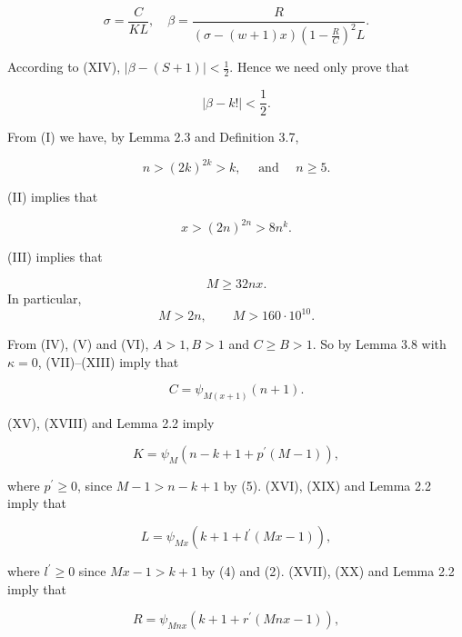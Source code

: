 \documentclass[10pt,letterpaper]{article}
\begin{document}
\[
\sigma=\frac{C}{K L}, \quad \beta=\frac{R}{(\sigma-(w+1) x)\left(1-\frac{R}{C}\right)^{2} L} .
\]

According to (XIV), $|\beta-(S+1)|<\frac{1}{2}$. Hence we need only prove that


\begin{equation*}
\left|\beta-k!\right|<\frac12. \tag{1}
\end{equation*}


From (I) we have, by Lemma 2.3 and Definition 3.7,


\begin{equation*}
n>(2 k)^{2 k}>k, \quad \text { and } \quad n \geq 5 . \tag{2}
\end{equation*}


(II) implies that


\begin{equation*}
x>(2 n)^{2 n}>8 n^{k} . \tag{3}
\end{equation*}


(III) implies that


\begin{equation*}
M\geq32nx.\tag{4}
\end{equation*}
In particular,
\begin{equation*}
M>2n,\qquad M>160\cdot10^{10}.\tag{5}
\end{equation*}


From (IV), (V) and (VI), $A>1, B>1$ and $C \geq B>1$. So by Lemma 3.8 with $\kappa=0$, (VII)--(XIII) imply that


\begin{equation*}
C=\psi_{M(x+1)}(n+1) . \tag{6}
\end{equation*}


(XV), (XVIII) and Lemma 2.2 imply


\begin{equation*}
K=\psi_{M}\left(n-k+1+p^{\prime}(M-1)\right), \tag{7}
\end{equation*}


where $p^{\prime} \geq 0$, since $M-1>n-k+1$ by (5). (XVI), (XIX) and Lemma 2.2 imply that


\begin{equation*}
L=\psi_{M x}\left(k+1+l^{\prime}(M x-1)\right), \tag{8}
\end{equation*}


where $l^{\prime} \geq 0$ since $M x-1>k+1$ by (4) and (2). (XVII), (XX) and Lemma 2.2 imply that


\begin{equation*}
R=\psi_{M n x}\left(k+1+r^{\prime}(M n x-1)\right), \tag{9}
\end{equation*}
\end{document}

